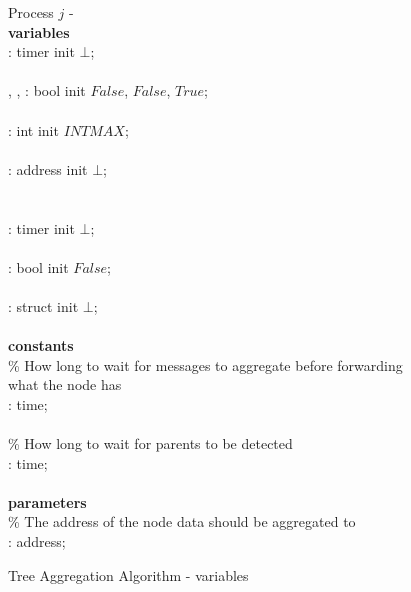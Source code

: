 \begin{figure}[H]
  \centering
  \begin{boxedminipage}{\linewidth}
    \null Process $j$ - \\
    \null \textbf{variables}\\
    \null\qq {}: timer init $\bot$;\\~\\
    \null\qq {}, , : bool init $False$, $False$, $True$;\\~\\
    \null\qq {}: int init $INTMAX$;\\~\\
    \null\qq {}: address init $\bot$;\\~\\~\\
    \null\qq {}: timer init $\bot$;\\~\\
    \null\qq {}: bool init $False$;\\~\\
    \null\qq {}: struct init $\bot$;\\~\\
    \null \textbf{constants}\\
    \null\qq \% How long to wait for messages to aggregate before forwarding what the node has\\
    \null\qq {}: time;\\~\\
    \null\qq \% How long to wait for parents to be detected\\
    \null\qq {}: time;\\~\\
    \null \textbf{parameters}\\
    \null\qq \% The address of the node data should be aggregated to\\
    \null\qq {}: address;\\
  \end{boxedminipage}
  \caption{Tree Aggregation Algorithm - variables}
\end{figure}

